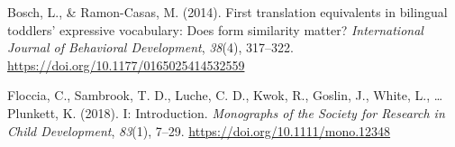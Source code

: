 \documentclass[english,man,man,floatsintext]{apa6}
\begin{document}
\leavevmode\hypertarget{ref-bosch2014}{}%
Bosch, L., \& Ramon-Casas, M. (2014). First translation equivalents in bilingual toddlers' expressive vocabulary: Does form similarity matter? \emph{International Journal of Behavioral Development}, \emph{38}(4), 317--322. \url{https://doi.org/10.1177/0165025414532559}

\leavevmode\hypertarget{ref-floccia2018}{}%
Floccia, C., Sambrook, T. D., Luche, C. D., Kwok, R., Goslin, J., White, L., \ldots{} Plunkett, K. (2018). I: Introduction. \emph{Monographs of the Society for Research in Child Development}, \emph{83}(1), 7--29. \url{https://doi.org/10.1111/mono.12348}

\endgroup
\end{document}
